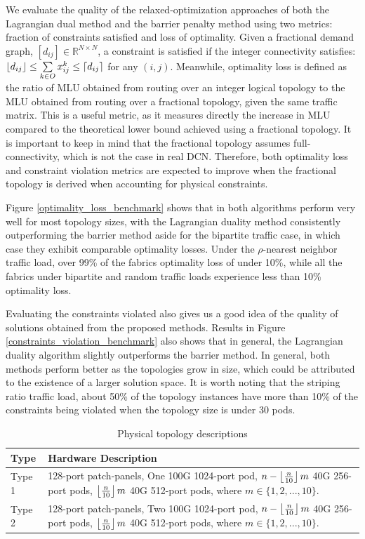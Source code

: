 \documentclass[sigconf]{acmart}
\theoremstyle{definition}
\begin{document}
We evaluate the quality of the relaxed-optimization approaches of both the Lagrangian dual method and the barrier penalty method using two metrics: fraction of constraints satisfied and loss of optimality. Given a fractional demand graph, $[d_{ij}] \in \mathbb{R}^{N \times N}$, a constraint is satisfied if the integer connectivity satisfies: $\left\lfloor d_{ij} \right\rfloor\leq \sum\limits_{k \in O}x_{ij}^k \leq \left\lceil d_{ij} \right\rceil$ for any $(i, j)$. Meanwhile, optimality loss is defined as the ratio of MLU obtained from routing over an integer logical topology to the MLU obtained from routing over a fractional topology, given the same traffic matrix. This is a useful metric, as it measures directly the increase in MLU compared to the theoretical lower bound achieved using a  fractional topology. It is important to keep in mind that the fractional topology assumes full-connectivity, which is not the case in real DCN. Therefore, both optimality loss and constraint violation metrics are expected to improve when the fractional topology is derived when accounting for physical constraints.

Figure \ref{optimality_loss_benchmark} shows that in both algorithms perform very well for most topology sizes, with the Lagrangian duality method consistently outperforming the barrier method aside for the bipartite traffic case, in which case they exhibit comparable optimality losses. Under the $\rho$-nearest neighbor traffic load, over 99\% of the fabrics optimality loss of under 10\%, while all the fabrics under bipartite and random traffic loads experience less than 10\% optimality loss.

Evaluating the constraints violated also gives us a good idea of the quality of solutions obtained from the proposed methods. Results in Figure \ref{constraints_violation_benchmark} also shows that in general, the Lagrangian duality algorithm slightly outperforms the barrier method. In general, both methods perform better as the topologies grow in size, which could be attributed to the existence of a larger solution space. It is worth noting that the striping ratio traffic load, about 50\% of the topology instances have more than 10\% of the constraints being violated when the topology size is under 30 pods.


\begin{table}
\begin{tabular}{|p{1.5cm}|p{6.4cm}|}
\hline
\textbf{Type} & \textbf{Hardware Description} \\
\hline\hline
{Type 1} & 128-port patch-panels, One 100G 1024-port pod, $n - \left\lfloor \frac{n}{10} \right\rfloor m$ 40G 256-port pods, $\left\lfloor \frac{n}{10} \right\rfloor m$ 40G 512-port pods, where $m \in \{1, 2, ..., 10\}$.\\
\hline
{Type 2} & 128-port patch-panels, Two 100G 1024-port pod, $n - \left\lfloor \frac{n}{10} \right\rfloor m$ 40G 256-port pods, $\left\lfloor \frac{n}{10} \right\rfloor m$ 40G 512-port pods, where $m \in \{1, 2, ..., 10\}$.\\
\hline
\end{tabular}
\caption{Physical topology descriptions} 
\label{topology_description}
\end{table}
\end{document}
